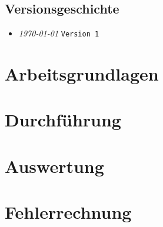 \documentclass{fhnwreport/fhnwreport}
\begin{document}


\pagestyle{empty}
{
    \renewcommand{\thispagestyle}[1]{}
    \tableofcontents
    \vspace{30mm}
    \subsection*{Versionsgeschichte}
    \begin{itemize}
        \item[]
            \emph{\today} \texttt{Version 1}
    \end{itemize}
}

\clearpage
\setcounter{page}{1}
\pagestyle{headings}


\clearpage
\section{Arbeitsgrundlagen}
\label{sec:arbeitsgrundlagen}



\clearpage
\section{Durchf\"uhrung}
\label{sec:durchfuehrung}



\clearpage
\section{Auswertung}
\label{sec:auswertung}



\clearpage
\section{Fehlerrechnung}
\label{sec:fehlerrechnung}

\end{document}
